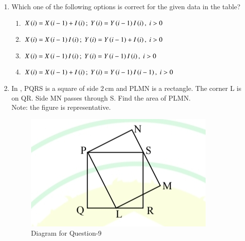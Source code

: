 \documentclass[journal,12pt,onecolumn]{IEEEtran}
\theoremstyle{remark}
\begin{document}
\begin{enumerate}
\item Which one of the following options is correct for the given data in the table? 
\par\hfill{}
\begin{table}[H]
    \centering
     
\end{table}
\begin{enumerate}
\item $X\left(i\right) = X\left(i-1\right) + I\left(i\right); \; Y\left(i\right) = Y\left(i-1\right) I\left(i\right), \; i>0$
\item $X\left(i\right) = X\left(i-1\right) I\left(i\right); \; Y\left(i\right) = Y\left(i-1\right) + I\left(i\right), \; i>0$
\item $X\left(i\right) = X\left(i-1\right) I\left(i\right); \; Y\left(i\right) = Y\left(i-1\right) I\left(i\right), \; i>0$
\item $X\left(i\right) = X\left(i-1\right) + I\left(i\right); \; Y\left(i\right) = Y\left(i-1\right) I\left(i-1\right), \; i>0$
\end{enumerate}

\item In , PQRS is a square of side $2 \, \text{cm}$ and PLMN is a rectangle. The corner L is on QR. Side MN passes through S. Find the area of PLMN.\\
Note: the figure is representative. \par\hfill{}
\begin{figure}[H]
\centering
\includegraphics[width=0.4\columnwidth]{Figs/Q-9.jpg}
\caption{Diagram for Question-9}
\label{9}
\end{figure}
\begin{enumerate}
\end{enumerate}


\end{enumerate}
\end{document}
